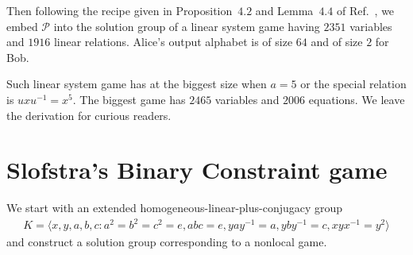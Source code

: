\documentclass[11pt,letterpaper]{article}
\newcommand{\1}{\mathbb{1}}
\newcommand{\Pg}{\mathcal{P}}
\theoremstyle{definition}
\begin{document}
Then following the recipe given in Proposition~$4.2$ and Lemma~$4.4$ of Ref.~\cite{slofstra2017}, we embed $\Pg$ into the solution 
group of a linear system game having $2351$ variables and $1916$ linear relations. 
Alice's output alphabet is of size $64$ and of size $2$ for Bob.

Such linear system game has at the biggest size when $a = 5$ or the special relation is $uxu^{-1} = x^5$.
The biggest game has $2465$ variables and $2006$ equations. We leave the derivation for curious readers.
\section{Slofstra's Binary Constraint game}
We start with an extended homogeneous-linear-plus-conjugacy group
\begin{align}
	K = \langle x,y,a,b,c: a^2=b^2=c^2=e, abc=e, yay^{-1} = a, yby^{-1}=c, xyx^{-1}=y^2\rangle
\end{align}
and construct a solution group corresponding to a nonlocal game.
\end{document}
